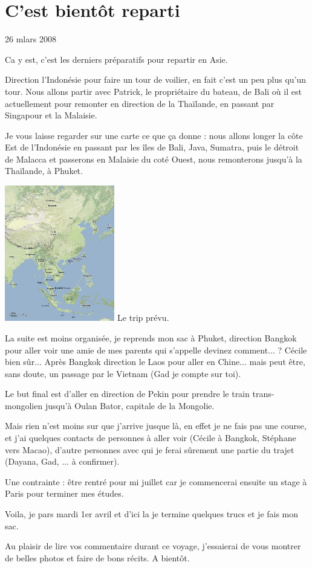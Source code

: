 \section{C'est bientôt reparti}

26 mlars 2008

\begin{multicols}{2}

Ca y est, c'est les derniers préparatifs pour repartir en Asie.

Direction l'Indonésie pour faire un tour de voilier, en fait c'est un peu plus qu'un tour. Nous allons partir avec Patrick, le propriétaire du bateau, de Bali où il est actuellement pour remonter en direction de la Thaïlande, en passant par Singapour et la Malaisie.

Je vous laisse regarder sur une carte ce que ça donne : nous allons longer la côte Est de l'Indonésie en passant par les îles de Bali, Java, Sumatra, puis le détroit de Malacca et passerons en Malaisie du coté Ouest, nous remonterons jusqu'à la Thaïlande, à Phuket.

\hspace*{-0.65cm}
\includegraphics[width=4.8cm]{articles/C-est-bientot-reparti/trip.png}
Le trip prévu.

La suite est moins organisée, je reprends mon sac à Phuket, direction Bangkok pour aller voir une amie de mes parents qui s'appelle devinez comment... ? Cécile bien sûr... Après Bangkok direction le Laos pour aller en Chine... mais peut être, sans doute, un passage par le Vietnam (Gad je compte sur toi).

Le but final est d'aller en direction de Pekin pour prendre le train trans-mongolien jusqu'à Oulan Bator, capitale de la Mongolie.

Mais rien n'est moins sur que j'arrive jusque là, en effet je ne fais pas une course, et j'ai quelques contacts de personnes à aller voir (Cécile à Bangkok, Stéphane vers Macao), d'autre personnes avec qui je ferai sûrement une partie du trajet (Dayana, Gad, ... à confirmer).

Une contrainte : être rentré pour mi juillet car je commencerai ensuite un stage à Paris pour terminer mes études.

Voila, je pars mardi 1er avril et d'ici la je termine quelques trucs et je fais mon sac.

Au plaisir de lire vos commentaire durant ce voyage, j'essaierai de vous montrer de belles photos et faire de bons récits. A bientôt.

\end{multicols}


